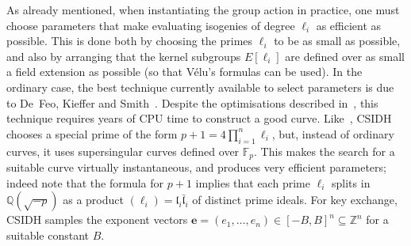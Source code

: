 \documentclass{llncs}
\newcommand{\F}{\mathbb{F}}
\newcommand{\OO}{\mathcal{O}}
\newcommand{\Q}{\mathbb{Q}}
\newcommand{\Z}{\mathbb{Z}}
\DeclareMathOperator{\Cl}{Cl}
\renewcommand{\l}{\mathfrak{l}}
\newcommand{\e}{\mathbf{e}}
\begin{document}
As already mentioned, when instantiating the group action in practice, one must choose parameters that make evaluating isogenies of degree $\ell_i$ as efficient as possible.
This is done both by choosing the primes $\ell_i$ to be as small as possible, and also by arranging that the kernel subgroups $E[ \ell_i ]$ are defined over as small a field extension as possible (so that V\'elu's formulas can be used).
In the ordinary case, the best technique currently available to select parameters is due to De~Feo, Kieffer and Smith~\cite{DFKS18}.
Despite the optimisations described in~\cite{DFKS18}, this technique requires years of CPU time to construct a good curve.
Like~\cite{DFKS18}, CSIDH~\cite{CLMPR18} chooses a special prime of the form $p+1 = 4\prod_{i=1}^n\ell_i$, but, instead of ordinary curves, it uses supersingular curves defined over $\F_p$.
This makes the search for a suitable curve virtually instantaneous, and produces very efficient parameters; indeed note that the formula for $p+1$ implies
that each prime $\ell_i$ splits in $\Q(\sqrt{-p})$ as a product $(\ell_i) = \l_i \bar{\l}_i$ of distinct prime ideals.
For key exchange, CSIDH samples the exponent vectors $\e = (e_1, \dots, e_n) \in [-B,B]^n \subseteq \Z^n$ for a suitable constant $B$.
\end{document}
